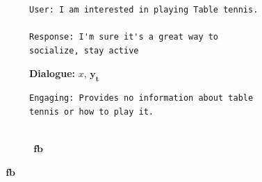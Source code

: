 \begin{figure}[t]
\centering
\small
\begin{subfigure}[T]{0.295\textwidth}
\centering
\caption{\textbf{Dialogue:} $x$, $\mathbf{y_{t}}$}
\label{fig:dialog1}
\begin{verbatim}
User: I am interested in playing Table tennis.

Response: I'm sure it's a great way to socialize, stay active
\end{verbatim}
\end{subfigure}
\begin{subfigure}[T]{0.34\textwidth}
\centering
\caption{\textbf{\fbmod} $~~\mathbf{fb}$}
\label{fig:dialog2}
\begin{verbatim}
Engaging: Provides no information about table tennis or how to play it.


\end{verbatim}
\end{subfigure}
\end{figure}
